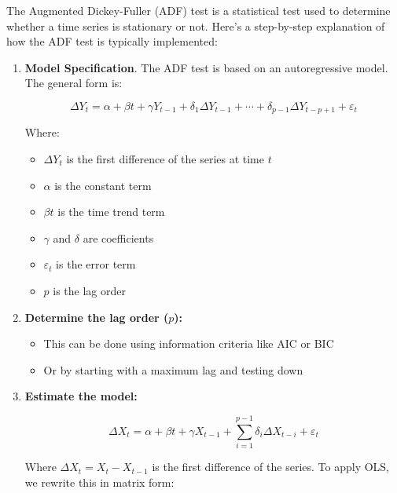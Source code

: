 \documentclass{article}
\begin{document}
  \begin{definition}
    The Augmented Dickey-Fuller (ADF) test is a statistical test used to determine whether a time series is stationary or not. Here's a step-by-step explanation of how the ADF test is typically implemented:

    \begin{enumerate}
      \item \textbf{Model Specification}. The ADF test is based on an autoregressive model. The general form is:
      
      \begin{equation}
      \Delta Y_t = \alpha + \beta t + \gamma Y_{t-1} + \delta_1 \Delta Y_{t-1} + \cdots + \delta_{p-1} \Delta Y_{t-p+1} + \varepsilon_t
      \end{equation}
      
      Where:
      \begin{itemize}
          \item $\Delta Y_t$ is the first difference of the series at time $t$
          \item $\alpha$ is the constant term
          \item $\beta t$ is the time trend term
          \item $\gamma$ and $\delta$ are coefficients
          \item $\varepsilon_t$ is the error term
          \item $p$ is the lag order
      \end{itemize}

      \item \textbf{Determine the lag order ($p$):}
      \begin{itemize}
          \item This can be done using information criteria like AIC or BIC
          \item Or by starting with a maximum lag and testing down
      \end{itemize}

      \item \textbf{Estimate the model:}

      \begin{equation}
      \Delta X_t = \alpha + \beta t + \gamma X_{t-1} + \sum_{i=1}^{p-1} \delta_i \Delta X_{t-i} + \varepsilon_t
      \end{equation}

      Where $\Delta X_t = X_t - X_{t-1}$ is the first difference of the series. To apply OLS, we rewrite this in matrix form:


\end{enumerate}
\end{definition}
\end{document}
